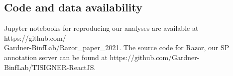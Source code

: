 \subsection{Code and data availability}
Jupyter notebooks for reproducing our analyses are available at
https://github.com/\\Gardner-BinfLab/Razor\_paper\_2021. The source code for Razor, our SP annotation server can be found at https://github.com/Gardner-BinfLab/TISIGNER-ReactJS.





